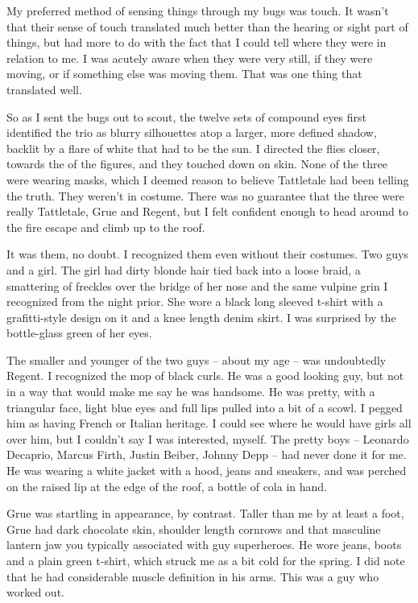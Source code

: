 My preferred method of sensing things through my bugs was touch. It wasn't that their sense of touch translated much better than the hearing or sight part of things, but had more to do with the fact that I could tell where they were in relation to me. I was acutely aware when they were very still, if they were moving, or if something else was moving them. That was one thing that translated well.

So as I sent the bugs out to scout, the twelve sets of compound eyes first identified the trio as blurry silhouettes atop a larger, more defined shadow, backlit by a flare of white that had to be the sun. I directed the flies closer, towards the  of the figures, and they touched down on skin. None of the three were wearing masks, which I deemed reason to believe Tattletale had been telling the truth. They weren't in costume. There was no guarantee that the three were really Tattletale, Grue and Regent, but I felt confident enough to head around to the fire escape and climb up to the roof.

It was them, no doubt. I recognized them even without their costumes. Two guys and a girl. The girl had dirty blonde hair tied back into a loose braid, a smattering of freckles over the bridge of her nose and the same vulpine grin I recognized from the night prior. She wore a black long sleeved t-shirt with a grafitti-style design on it and a knee length denim skirt. I was surprised by the bottle-glass green of her eyes.

The smaller and younger of the two guys -- about my age -- was undoubtedly Regent. I recognized the mop of black curls. He was a good looking guy, but not in a way that would make me say he was handsome. He was pretty, with a triangular face, light blue eyes and full lips pulled into a bit of a scowl. I pegged him as having French or Italian heritage. I could see where he would have girls all over him, but I couldn't say I was interested, myself. The pretty boys -- Leonardo Decaprio, Marcus Firth, Justin Beiber, Johnny Depp -- had never done it for me. He was wearing a white jacket with a hood, jeans and sneakers, and was perched on the raised lip at the edge of the roof, a bottle of cola in hand.

Grue was startling in appearance, by contrast. Taller than me by at least a foot, Grue had dark chocolate skin, shoulder length cornrows and that masculine lantern jaw you typically associated with guy superheroes. He wore jeans, boots and a plain green t-shirt, which struck me as a bit cold for the spring. I did note that he had considerable muscle definition in his arms. This was a guy who worked out.

